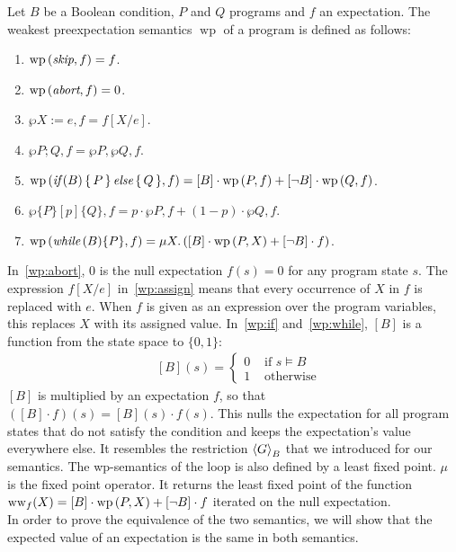 \begin{definition}
	Let $B$ be a Boolean condition, $P$ and $Q$ programs and $f$ an expectation.
	The weakest preexpectation semantics $\operatorname{wp}$ of a program is defined as follows:
	\begin{enumerate}
		\item $\operatorname{wp}\left( \textit{skip}, f \right) = f$.
		\item $\operatorname{wp}\left( \textit{abort}, f \right) = 0$. \label{wp:abort}
		\item $\wp{X := e, f} = f[X/e]$. \label{wp:assign}
		\item $\wp{P; Q, f} = \wp{P, \wp{Q, f}}$.
		\item $\operatorname{wp}\left( \textit{if}\,(B) \, \{ \, P \, \} \, \textit{else} \, \{ \, Q \, \}, f \right)
			= [B] \cdot \operatorname{wp}\left( P, f \right) + [\lnot B] \cdot \operatorname{wp}\left( Q, f \right)$. \label{wp:if}
		\item $\wp{\{ P \}[p]\{ Q \}, f}
			= p \cdot \wp{P, f} + (1-p) \cdot \wp{Q, f}$.
		\item $\operatorname{wp}\left( \textit{while}\,(B) \{P\}, f \right)
			= \mu X. \left( [B] \cdot \operatorname{wp}\left( P, X \right) + [\lnot B] \cdot f \right)$. \label{wp:while}
	\end{enumerate}
\end{definition}
In~\ref{wp:abort}, 0 is the null expectation $f(s) = 0$ for any program state $s$.
The expression $f[X/e]$ in~\ref{wp:assign} means that every occurrence of $X$ in $f$ is replaced with $e$.
When $f$ is given as an expression over the program variables, this replaces $X$ with its assigned value.
In~\ref{wp:if} and~\ref{wp:while}, $[B]$ is a function from the state space to $\{0, 1\}$:
\begin{align*}
	& [B](s) = \begin{cases}
		0 & \text{ if } s \models B \\
		1 & \text{ otherwise}
	\end{cases}
\end{align*}
$[B]$ is multiplied by an expectation $f$, so that $([B] \cdot f)(s) = [B](s) \cdot f(s)$.
This nulls the expectation for all program states that do not satisfy the condition and keeps the expectation's value everywhere else.
It resembles the restriction $\left\langle G \right\rangle_{B}$ that we introduced for our semantics.
The wp-semantics of the loop is also defined by a least fixed point.
$\mu$ is the fixed point operator.
It returns the least fixed point of the function $\operatorname{ww}_f(X) = [B] \cdot \operatorname{wp}\left( P, X \right) + [\lnot B] \cdot f$ iterated on the null expectation. \\
In order to prove the equivalence of the two semantics, we will show that the expected value of an expectation is the same in both semantics.
